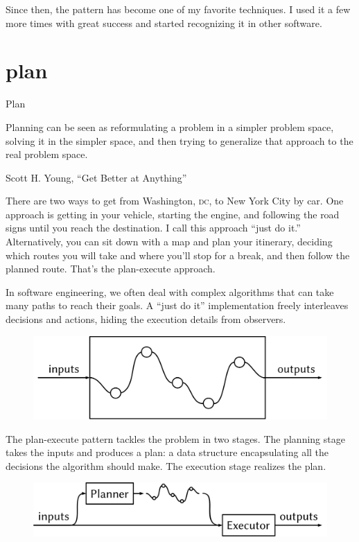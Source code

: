 \documentclass{article}
\begin{document}
Since then, the pattern has become one of my favorite techniques.
I used it a few more times with great success and started recognizing it in other software.

\section{plan}{Plan}

\epigraph{
    Planning can be seen as reformulating a problem in a simpler problem space, solving it in the simpler space, and then trying to generalize that approach to the real problem space.
}{Scott H. Young, ``Get Better at Anything''}

There are two ways to get from Washington, \textsc{dc}, to New York City by car.
One approach is getting in your vehicle, starting the engine, and following the road signs until you reach the destination.
I call this approach ``just do it.''
Alternatively, you can sit down with a map and plan your itinerary, deciding which routes you will take and where you'll stop for a break, and then follow the planned route.
That's the plan-execute approach.

In software engineering, we often deal with complex algorithms that can take many paths to reach their goals.
A ``just do it'' implementation freely interleaves decisions and actions, hiding the execution details from observers.

\begin{figure}[grayscale-diagram]
\includegraphics{images/29-just-do-it.svg}
\end{figure}

The plan-execute pattern tackles the problem in two stages.
The planning stage takes the inputs and produces a plan: a data structure encapsulating all the decisions the algorithm should make.
The execution stage realizes the plan.

\begin{figure}[grayscale-diagram]
\includegraphics{images/29-plan-execute.svg}
\end{figure}
\end{document}
